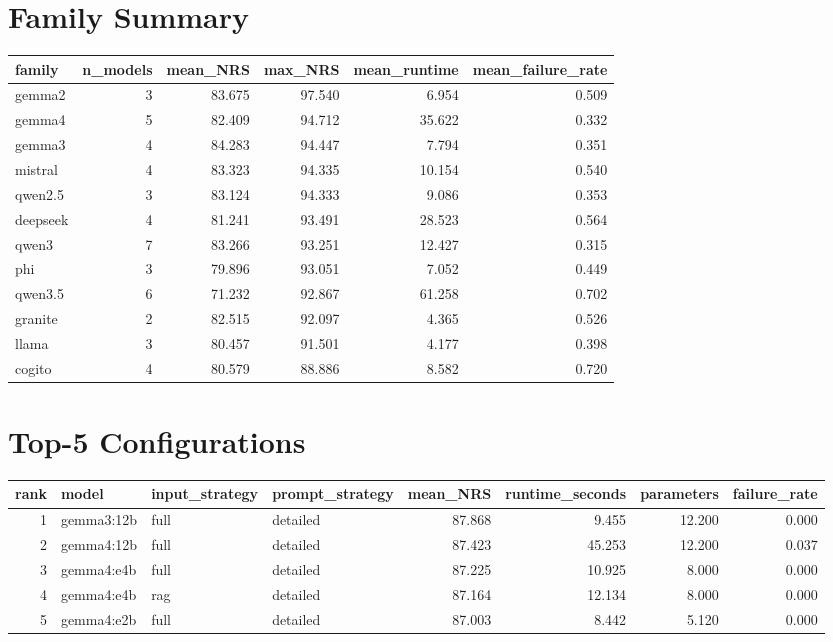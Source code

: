 \documentclass{article}
\begin{document}
\section{Family Summary}
\begin{tabular}{lrrrrr}
\toprule
family & n\_models & mean\_NRS & max\_NRS & mean\_runtime & mean\_failure\_rate \\
\midrule
gemma2 & 3 & 83.675 & 97.540 & 6.954 & 0.509 \\
gemma4 & 5 & 82.409 & 94.712 & 35.622 & 0.332 \\
gemma3 & 4 & 84.283 & 94.447 & 7.794 & 0.351 \\
mistral & 4 & 83.323 & 94.335 & 10.154 & 0.540 \\
qwen2.5 & 3 & 83.124 & 94.333 & 9.086 & 0.353 \\
deepseek & 4 & 81.241 & 93.491 & 28.523 & 0.564 \\
qwen3 & 7 & 83.266 & 93.251 & 12.427 & 0.315 \\
phi & 3 & 79.896 & 93.051 & 7.052 & 0.449 \\
qwen3.5 & 6 & 71.232 & 92.867 & 61.258 & 0.702 \\
granite & 2 & 82.515 & 92.097 & 4.365 & 0.526 \\
llama & 3 & 80.457 & 91.501 & 4.177 & 0.398 \\
cogito & 4 & 80.579 & 88.886 & 8.582 & 0.720 \\
\bottomrule
\end{tabular}

\section{Top-5 Configurations}
\begin{tabular}{rlllrrrr}
\toprule
rank & model & input\_strategy & prompt\_strategy & mean\_NRS & runtime\_seconds & parameters & failure\_rate \\
\midrule
1 & gemma3:12b & full & detailed & 87.868 & 9.455 & 12.200 & 0.000 \\
2 & gemma4:12b & full & detailed & 87.423 & 45.253 & 12.200 & 0.037 \\
3 & gemma4:e4b & full & detailed & 87.225 & 10.925 & 8.000 & 0.000 \\
4 & gemma4:e4b & rag & detailed & 87.164 & 12.134 & 8.000 & 0.000 \\
5 & gemma4:e2b & full & detailed & 87.003 & 8.442 & 5.120 & 0.000 \\
\bottomrule
\end{tabular}
\end{document}
